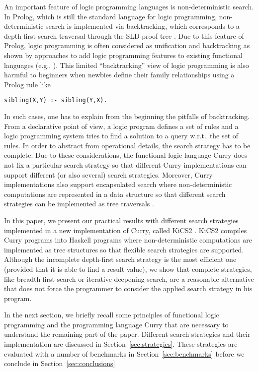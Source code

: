 \documentclass[english]{lni}
\begin{document}
An important feature of logic programming languages
is non-deterministic search.
In Prolog, which is still the standard language for logic programming,
non-deterministic search is implemented via backtracking,
which corresponds to a depth-first search traversal
through the SLD proof tree \cite{Lloyd87}.
Due to this feature of Prolog,
logic programming is often considered as unification and backtracking
as shown by approaches to add logic programming features
to existing functional languages
(e.g., \cite{ClaessenLjungloef00,Hinze01}).
This limited ``backtracking'' view of logic programming
is also harmful to beginners when newbies
define their family relationships using a Prolog rule like
\begin{lstlisting}
sibling(X,Y) :- sibling(Y,X).
\end{lstlisting}
In such cases, one has to explain from the beginning
the pitfalls of backtracking.
From a declarative point of view,
a logic program defines a set of rules
and a logic programming system tries to find
a solution to a query w.r.t.\ the set of rules.
In order to abstract from operational details,
the search strategy has to be complete.
Due to these considerations,
the functional logic language Curry \cite{Hanus06Curry}
does not fix a particular search strategy
so that different Curry implementations can support
different (or also several) search strategies.
Moreover, Curry implementations also
support encapsulated search
where non-deterministic computations are represented
in a data structure so that different search strategies
can be implemented as tree traversals
\cite{BrasselHanusHuch04JFLP,HanusSteiner98PLILP,Lux99FLOPS}.

In this paper, we present our practical results
with different search strategies implemented
in a new implementation of Curry, called
KiCS2 \cite{BrasselHanusPeemoellerReck11}.
KiCS2 compiles Curry programs into Haskell programs
where non-deterministic computations are implemented
as tree structures so that flexible search strategies
are supported.
Although the incomplete depth-first search strategy
is the most efficient one (provided that it is able
to find a result value),
we show that complete strategies,
like breadth-first search or iterative deepening search,
are a reasonable alternative that does not force
the programmer to consider the applied search strategy
in his program.

In the next section, we briefly recall some principles
of functional logic programming and the programming language Curry
that are necessary to understand the remaining part of the paper.
Different search strategies and their implementation
are discussed in Section~\ref{sec:strategies}.
These strategies are evaluated with a number of benchmarks
in Section~\ref{sec:benchmarks}
before we conclude in Section~\ref{sec:conclusions}
\end{document}
